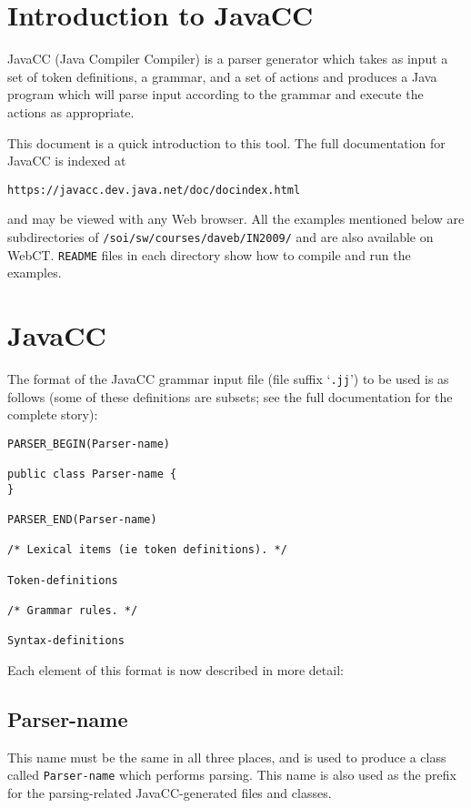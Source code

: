 \documentclass{article}
\begin{document}
\section{Introduction to JavaCC}

JavaCC (Java Compiler Compiler) is a parser generator which takes as input
a set of token definitions, a grammar, and a set of actions 
and produces a Java program which will parse
input according to the grammar and execute the actions as appropriate.

This document is a quick introduction to this tool.
The full documentation for JavaCC 
is indexed at
\begin{verbatim}
https://javacc.dev.java.net/doc/docindex.html
\end{verbatim}
and may be viewed with any Web browser.
All the examples mentioned below are
subdirectories of \verb+/soi/sw/courses/daveb/IN2009/+
and are also available on WebCT. 
\verb+README+ files in
each directory show how to compile and run the examples.

\section{JavaCC}

The format of the JavaCC grammar input file (file suffix `\verb+.jj+') 
to be used is as follows (some of these definitions are
subsets; see the full documentation for the complete story):
\begin{verbatim}
PARSER_BEGIN(Parser-name)

public class Parser-name {
}

PARSER_END(Parser-name)

/* Lexical items (ie token definitions). */

Token-definitions

/* Grammar rules. */

Syntax-definitions
\end{verbatim}
Each element of this format is now described in more detail:

\subsection*{Parser-name}

This name must be the same in all three places, and is used to produce a class
called \verb+Parser-name+ which performs parsing. This name is also used as the 
prefix for the parsing-related JavaCC-generated files and classes.
\end{document}
